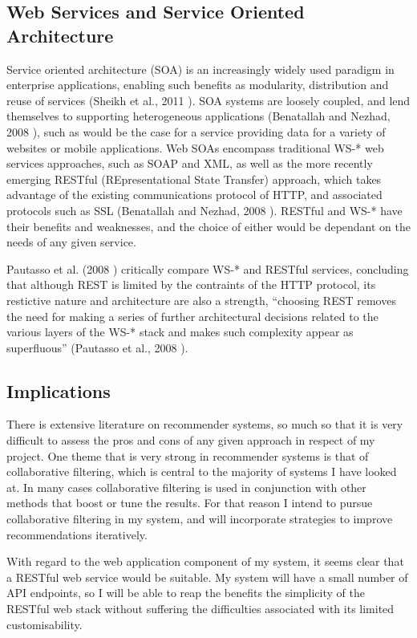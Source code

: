 \subsection{Web Services and Service Oriented Architecture}

Service oriented architecture (SOA) is an increasingly widely used paradigm in enterprise applications, enabling such benefits as modularity, distribution and reuse of services (Sheikh et al., 2011 \cite{Sheikh11}). SOA systems are loosely coupled, and lend themselves to supporting heterogeneous applications (Benatallah and Nezhad, 2008 \cite{Benatallah08}), such as would be the case for a service providing data for a variety of websites or mobile applications. Web SOAs encompass traditional WS-* web services approaches, such as SOAP and XML, as well as the more recently emerging RESTful (REpresentational State Transfer) approach, which takes advantage of the existing communications protocol of HTTP, and associated protocols such as SSL (Benatallah and Nezhad, 2008 \cite{Benatallah08}). RESTful and WS-* have their benefits and weaknesses, and the choice of either would be dependant on the needs of any given service. 

Pautasso et al. (2008 \cite{Pautasso08}) critically compare WS-* and RESTful services, concluding that although REST is limited by the contraints of the HTTP protocol, its restictive nature and architecture are also a strength, ``choosing REST removes the need for making a series of further architectural decisions related to the various layers of the WS-* stack and makes such complexity appear as superfluous'' (Pautasso et al., 2008 \cite{Pautasso08}).

\subsection{Implications}

There is extensive literature on recommender systems, so much so that it is very difficult to assess the pros and cons of any given approach in respect of my project. One theme that is very strong in recommender systems is that of collaborative filtering, which is central to the majority of systems I have looked at. In many cases collaborative filtering is used in conjunction with other methods that boost or tune the results. For that reason I intend to pursue collaborative filtering in my system, and will incorporate strategies to improve recommendations iteratively.

With regard to the web application component of my system, it seems clear that a RESTful web service would be suitable. My system will have a small number of API endpoints, so I will be able to reap the benefits the simplicity of the RESTful web stack without suffering the difficulties associated with its limited customisability.

